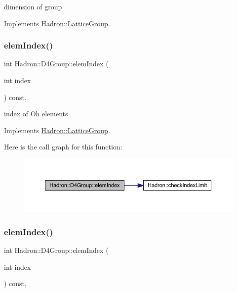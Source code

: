 dimension of group 

Implements \mbox{\hyperlink{structHadron_1_1LatticeGroup_abd8415698323796ef6a8605796ee3bea}{Hadron\+::\+Lattice\+Group}}.

\mbox{\label{structHadron_1_1D4Group_aa4ca8a3f1bc6774b630cd6a354179298}} 
\subsubsection{\texorpdfstring{elemIndex()}{elemIndex()}\hspace{0.1cm}{\footnotesize\ttfamily [1/3]}}
{\footnotesize\ttfamily int Hadron\+::\+D4\+Group\+::elem\+Index (\begin{DoxyParamCaption}\item[{int}]{index }\end{DoxyParamCaption}) const\hspace{0.3cm}{\ttfamily [inline]}, {\ttfamily [virtual]}}

index of Oh elements 

Implements \mbox{\hyperlink{structHadron_1_1LatticeGroup_afb8e3ee60de059f75bce1044c694e1e8}{Hadron\+::\+Lattice\+Group}}.

Here is the call graph for this function\+:
\nopagebreak
\begin{figure}[H]
\begin{center}
\leavevmode
\includegraphics[width=350pt]{de/d5e/structHadron_1_1D4Group_aa4ca8a3f1bc6774b630cd6a354179298_cgraph}
\end{center}
\end{figure}
\mbox{\label{structHadron_1_1D4Group_aa4ca8a3f1bc6774b630cd6a354179298}} 
\subsubsection{\texorpdfstring{elemIndex()}{elemIndex()}\hspace{0.1cm}{\footnotesize\ttfamily [2/3]}}
{\footnotesize\ttfamily int Hadron\+::\+D4\+Group\+::elem\+Index (\begin{DoxyParamCaption}\item[{int}]{index }\end{DoxyParamCaption}) const\hspace{0.3cm}{\ttfamily [inline]}, {\ttfamily [virtual]}}

